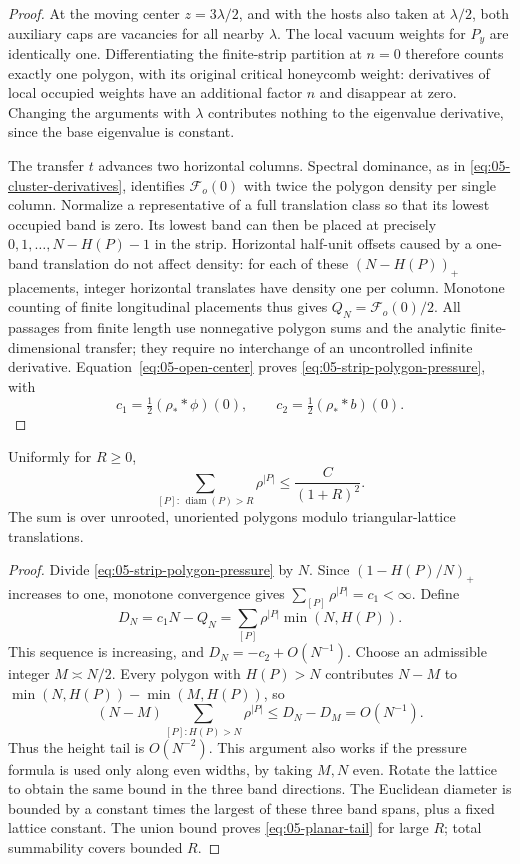\begin{proof}
At the moving center \(z=3\lambda/2\), and with the hosts also taken at \(\lambda/2\), both auxiliary caps are vacancies for all nearby \(\lambda\). The local vacuum weights for \(P_y\) are identically one. Differentiating the finite-strip partition at \(n=0\) therefore counts exactly one polygon, with its original critical honeycomb weight: derivatives of local occupied weights have an additional factor \(n\) and disappear at zero. Changing the arguments with \(\lambda\) contributes nothing to the eigenvalue derivative, since the base eigenvalue is constant.

The transfer \(t\) advances two horizontal columns. Spectral dominance, as in \eqref{eq:05-cluster-derivatives}, identifies \(\mathcal F_o(0)\) with twice the polygon density per single column. Normalize a representative of a full translation class so that its lowest
occupied band is zero. Its lowest band can then be placed at precisely
\(0,1,\ldots,N-H(P)-1\) in the strip. Horizontal half-unit offsets
caused by a one-band translation do not affect density: for each of these
\((N-H(P))_+\) placements, integer horizontal translates have density one
per column. Monotone counting of finite longitudinal placements thus gives \(Q_N=\mathcal F_o(0)/2\). All passages from finite length use nonnegative polygon sums and the analytic finite-dimensional transfer; they require no interchange of an uncontrolled infinite derivative. Equation~\eqref{eq:05-open-center} proves \eqref{eq:05-strip-polygon-pressure}, with
\[
 c_1=\tfrac12(\rho_* *\phi)(0),\qquad
 c_2=\tfrac12(\rho_* *b)(0).
\]
\end{proof}

\begin{theorem}
\label{thm:05-planar-tail}\label{E:polygon-tail}
Uniformly for \(R\ge0\),
\begin{equation}
 \sum_{[P]:\,\operatorname{diam}(P)>R}\rho^{|P|}
       \le\frac{C}{(1+R)^2}.
 \label{eq:05-planar-tail}
\end{equation}
The sum is over unrooted, unoriented polygons modulo triangular-lattice translations.
\end{theorem}

\begin{proof}
Divide \eqref{eq:05-strip-polygon-pressure} by \(N\). Since
\((1-H(P)/N)_+\) increases to one, monotone convergence gives
\(\sum_{[P]}\rho^{|P|}=c_1<\infty\).
Define
\[
 D_N=c_1N-Q_N=\sum_{[P]}\rho^{|P|}\min(N,H(P)).
\]
This sequence is increasing, and
\(D_N=-c_2+O(N^{-1})\).
Choose an admissible integer \(M\asymp N/2\). Every polygon with \(H(P)>N\) contributes \(N-M\) to
\(\min(N,H(P))-\min(M,H(P))\), so
\[
 (N-M)\sum_{[P]:H(P)>N}\rho^{|P|}
 \le D_N-D_M=O(N^{-1}).
\]
Thus the height tail is \(O(N^{-2})\). This argument also works if the pressure formula is used only along even widths, by taking \(M,N\) even. Rotate the lattice to obtain the same bound in the three band directions. The Euclidean diameter is bounded by a constant times the largest of these three band spans, plus a fixed lattice constant. The union bound proves \eqref{eq:05-planar-tail} for large \(R\); total summability covers bounded \(R\).
\end{proof}

